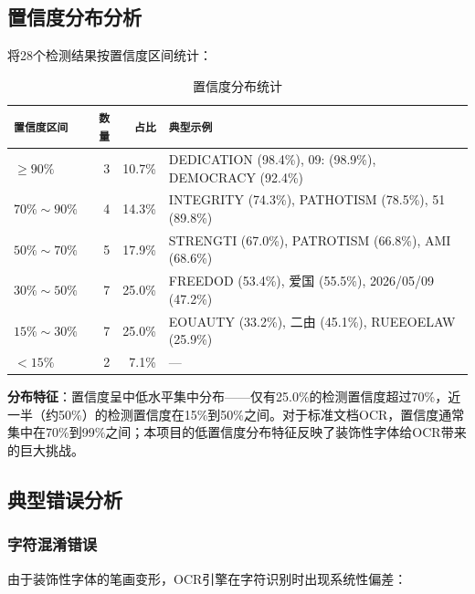 \documentclass[12pt,hyperref,a4paper,UTF8]{ctexart}
\begin{document}
\subsection{置信度分布分析}

将28个检测结果按置信度区间统计：

\begin{table}[!htbp]
    \centering
    \begin{tabular}{l|r|r|l}
        \hline
        \texttt{置信度区间} & \texttt{数量} & \texttt{占比} & \texttt{典型示例} \\
        \hline
        $\geq 90\%$ & 3 & 10.7\% & DEDICATION (98.4\%), 09: (98.9\%), DEMOCRACY (92.4\%) \\
        $70\% \sim 90\%$ & 4 & 14.3\% & INTEGRITY (74.3\%), PATHOTISM (78.5\%), 51 (89.8\%) \\
        $50\% \sim 70\%$ & 5 & 17.9\% & STRENGTI (67.0\%), PATROTISM (66.8\%), AMI (68.6\%) \\
        $30\% \sim 50\%$ & 7 & 25.0\% & FREEDOD (53.4\%), 爱国 (55.5\%), 2026/05/09 (47.2\%) \\
        $15\% \sim 30\%$ & 7 & 25.0\% & EOUAUTY (33.2\%), 二由 (45.1\%), RUEEOELAW (25.9\%) \\
        $< 15\%$ & 2 & 7.1\% & — \\
        \hline
    \end{tabular}
    \caption{置信度分布统计}
    \label{tab:conf_dist}
\end{table}

\textbf{分布特征}：置信度呈中低水平集中分布——仅有25.0\%的检测置信度超过70\%，近一半（约50\%）的检测置信度在15\%到50\%之间。对于标准文档OCR，置信度通常集中在70\%到99\%之间；本项目的低置信度分布特征反映了装饰性字体给OCR带来的巨大挑战。

\subsection{典型错误分析}

\subsubsection{字符混淆错误}

由于装饰性字体的笔画变形，OCR引擎在字符识别时出现系统性偏差：
\end{document}
